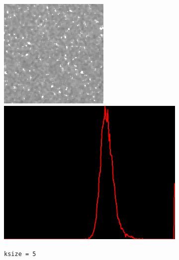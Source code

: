 \begin{figure}[H]
\begin{subfigure}[b]{0.24\textwidth}
        \includegraphics[width=\textwidth]{img2/rect_5_median_5_final_img2.png}\\[0.1cm]
        \includegraphics[width=\textwidth]{img2/hist_rect_5_median_5_final_img2.png}
        \caption{\lstinline|ksize = 5|}
        \label{fig:img2_kernel5}
    \end{subfigure}
    \begin{subfigure}[b]{0.24\textwidth}

\end{subfigure}
\end{figure}
